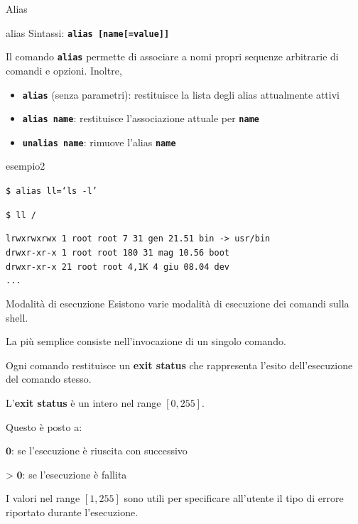 \documentclass{beamer}
\begin{document}
    \begin{frame}{Alias}
        \begin{block}{alias}
            \small
            Sintassi: \texttt{\textbf{alias [name[=value]]}}

            Il comando \texttt{\textbf{alias}} permette di associare a nomi propri sequenze arbitrarie
            di comandi e opzioni. Inoltre,

            \begin{itemize}
                \item \texttt{\textbf{alias}} (senza parametri): restituisce la lista degli alias attualmente attivi
                \item \texttt{\textbf{alias name}}: restituisce l'associazione attuale per \texttt{\textbf{name}}
                \item \texttt{\textbf{unalias name}}: rimuove l'alias \texttt{\textbf{name}}
            \end{itemize}
        \end{block}

        \begin{exampleblock}{esempio2}
            \scriptsize

            \texttt{\$ alias ll=`ls -l'}
            
            \texttt{\$ ll /}

            \texttt{lrwxrwxrwx   1 root root    7 31 gen 21.51 bin -> usr/bin \\
            drwxr-xr-x   1 root root  180 31 mag 10.56 boot \\
            drwxr-xr-x  21 root root 4,1K  4 giu 08.04 dev \\
            ...
            }
        \end{exampleblock}
    \end{frame}

    \begin{frame}{Modalità di esecuzione}
        Esistono varie modalità di esecuzione dei comandi sulla shell.
        
        La più semplice consiste nell'invocazione di un singolo comando.

        Ogni comando restituisce un \textbf{exit status} che
        rappresenta l'esito dell'esecuzione del comando stesso.

        \vspace{0.5cm}

        L'\textbf{exit status} è un intero nel range $[0,255]$.
        
        Questo è posto a:
        
        \hspace{1cm} $\textbf{0}$: se l'esecuzione è riuscita con successivo

        \hspace{1cm} $\textbf{> 0}$: se l'esecuzione è fallita

        \vspace{0.5cm}

        I valori nel range $[1,255]$ sono utili per specificare all'utente il tipo di errore
        riportato durante l'esecuzione.
    \end{frame}
\end{document}
